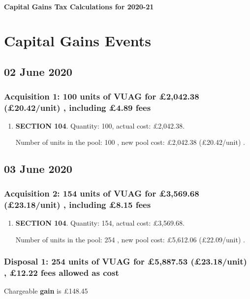 \documentclass{article}
\begin{document}
\centerline{\Large\bfseries Capital Gains Tax Calculations for 2020-21}

\section*{Capital Gains Events}


\subsection*{02 June 2020}
\subsubsection*{
    Acquisition 1: 100 units of VUAG for £2,042.38
    (£20.42/unit)%
    , including £4.89 fees
}

\begin{enumerate}
\item \textbf{SECTION 104}. Quantity: 100,
    actual cost: £2,042.38.

    Number of units in the pool:
    100%
,
    new pool cost: £2,042.38
    (£20.42/unit)%
.

\end{enumerate}



\subsection*{03 June 2020}
\subsubsection*{
    Acquisition 2: 154 units of VUAG for £3,569.68
    (£23.18/unit)%
    , including £8.15 fees
}

\begin{enumerate}
\item \textbf{SECTION 104}. Quantity: 154,
    actual cost: £3,569.68.

    Number of units in the pool:
    254%
,
    new pool cost: £5,612.06
    (£22.09/unit)%
.

\end{enumerate}

\subsubsection*{
    Disposal 1: 254 units of VUAG
for £5,887.53
    (£23.18/unit)%
    , £12.22 fees allowed as cost
}
Chargeable \textbf{gain} is £148.45
\end{document}
